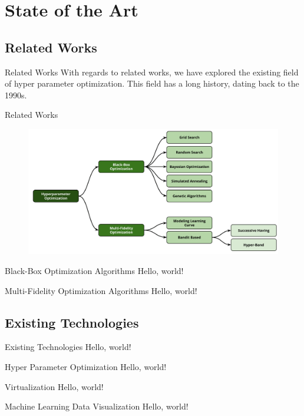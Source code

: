 \documentclass[10pt]{beamer}
\begin{document}
  \section{State of the Art}
  \subsection{Related Works}
  \begin{frame}{Related Works}
    With regards to related works, we have explored the existing field of hyper parameter optimization. This field has a long history, dating back to the 1990s.
  \end{frame}
  \begin{frame}{Related Works}
    \begin{figure}
          \centering
          \includegraphics[width=\textwidth]{images/state_art-taxonomy_optimizers.png}
        \end{figure}
  \end{frame}
  \begin{frame}{Black-Box Optimization Algorithms}
    Hello, world!
  \end{frame}
  \begin{frame}{Multi-Fidelity Optimization Algorithms}
    Hello, world!
  \end{frame}
  \subsection{Existing Technologies}
  \begin{frame}{Existing Technologies}
    Hello, world!
  \end{frame}
  \begin{frame}{Hyper Parameter Optimization}
    Hello, world!
  \end{frame}
  \begin{frame}{Virtualization}
    Hello, world!
  \end{frame}
  \begin{frame}{Machine Learning Data Visualization}
    Hello, world!
  \end{frame}
\end{document}
